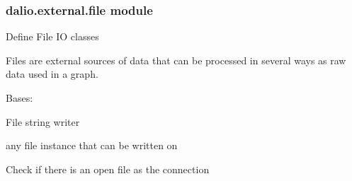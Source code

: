 \documentclass[letterpaper,10pt,english]{sphinxmanual}
\begin{document}
\subsubsection{dalio.external.file module}
\label{\detokenize{dalio.external:module-dalio.external.file}}\label{\detokenize{dalio.external:dalio-external-file-module}}
Define File IO classes

Files are external sources of data that can be processed in several ways as
raw data used in a graph.

\begin{fulllineitems}
\label{\detokenize{dalio.external:dalio.external.file.FileWriter}}
Bases: {\hyperref[\detokenize{dalio.external:dalio.external.external.External}]{}}

File string writer

\begin{fulllineitems}
\label{\detokenize{dalio.external:dalio.external.file.FileWriter._connection}}
any file instance that can be written on

\end{fulllineitems}


\begin{fulllineitems}
\label{\detokenize{dalio.external:dalio.external.file.FileWriter.check}}
Check if there is an open file as the connection

\end{fulllineitems}


\end{fulllineitems}
\end{document}
